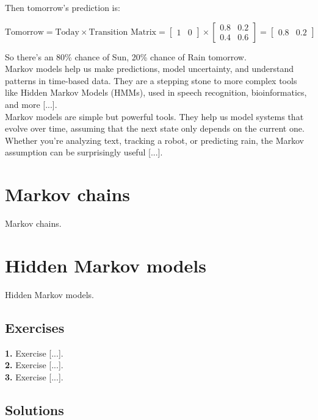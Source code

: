 \documentclass{book}
\begin{document}
Then tomorrow’s prediction is:

\[
\text{Tomorrow} = \text{Today} \times \text{Transition Matrix} = 
\begin{bmatrix} 1 & 0 \end{bmatrix} \times
\begin{bmatrix}
0.8 & 0.2 \\
0.4 & 0.6
\end{bmatrix}
=
\begin{bmatrix}
0.8 & 0.2
\end{bmatrix}
\]

So there's an 80\% chance of Sun, 20\% chance of Rain tomorrow.\\

Markov models help us make predictions, model uncertainty, and understand patterns in time-based data. They are a stepping stone to more complex tools like Hidden Markov Models (HMMs), used in speech recognition, bioinformatics, and more [...].\\

Markov models are simple but powerful tools. They help us model systems that evolve over time, assuming that the next state only depends on the current one. Whether you’re analyzing text, tracking a robot, or predicting rain, the Markov assumption can be surprisingly useful [...].

\section{Markov chains}
Markov chains.

\section{Hidden Markov models}
Hidden Markov models.

\newpage

\subsection*{Exercises}

\textbf{1.} Exercise [...].\\

\textbf{2.} Exercise [...].\\

\textbf{3.} Exercise [...].\\

\newpage

\subsection*{Solutions}
\end{document}
